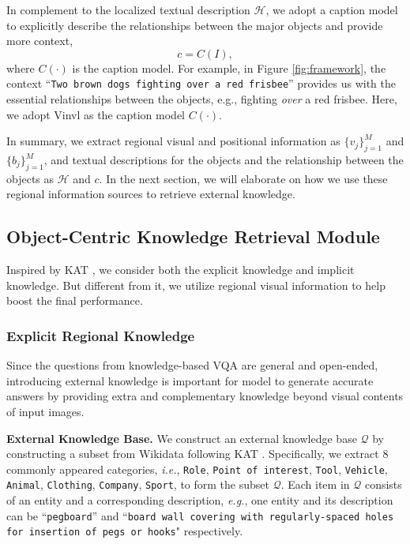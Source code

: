 \documentclass{article}
\begin{document}
In complement to the localized textual description $\mathcal{H}$, we adopt a caption model to explicitly describe the relationships between the major objects and provide more context,
\begin{equation}
    c = C(I),
\end{equation}
where $C(\cdot)$ is the caption model. For example, in Figure \ref{fig:framework}, the context ``\texttt{Two brown dogs fighting over a red frisbee}'' provides us with the essential relationships between the objects, e.g., fighting \textit{over} a red frisbee. Here, we adopt Vinvl \cite{zhang2021vinvl} as the caption model $C(\cdot)$.

In summary, we extract regional visual and positional information as $\{v_j\}_{j=1}^M$ and $\{b_j\}_{j=1}^M$, and textual descriptions for the objects and the relationship between the objects as $\mathcal{H}$ and $c$. In the next section, we will elaborate on how we use these regional information sources to retrieve external knowledge.

\subsection{Object-Centric Knowledge Retrieval Module}
\label{knowledge_module}

Inspired by KAT \cite{gui2021kat}, we consider both the explicit knowledge and implicit knowledge. But different from it, we utilize regional visual information to help boost the final performance.

\subsubsection{Explicit Regional Knowledge}
Since the questions from knowledge-based VQA \cite{marino2019ok} are general and open-ended, introducing external knowledge is important for model to generate accurate answers by providing extra and complementary knowledge beyond visual contents of input images.

\textbf{External Knowledge Base. } We construct an external knowledge base $\mathcal{Q}$ by constructing a subset from Wikidata \cite{vrandevcic2014wikidata} following KAT \cite{gui2021kat}. Specifically, we extract 8 commonly appeared categories, \textit{i.e.},  \texttt{Role}, \texttt{Point of interest}, \texttt{Tool}, \texttt{Vehicle}, \texttt{Animal}, \texttt{Clothing}, \texttt{Company}, \texttt{Sport}, to form the subset $\mathcal{Q}$. Each item in $\mathcal{Q}$ consists of an entity and a corresponding description, \textit{e.g.}, one entity and its description can be ``\texttt{pegboard}'' and ``\texttt{board wall covering with regularly-spaced holes for insertion of pegs or hooks}" respectively. 
\end{document}
